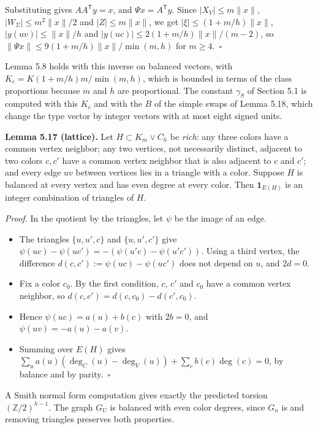 \documentclass[english,11pt,a4paper]{article}
\providecommand{\tightlist}{\setlength{\itemsep}{0pt}\setlength{\parskip}{0pt}}
\begin{document}
Substituting gives \(AA^{\mathsf T}y=x\), and \(\Psi x=A^{\mathsf T}y\). Since \(|X_V|\le m\|x\|\), \(|W_\Sigma|\le m^2\|x\|/2\) and \(|Z|\le m\|x\|\), we get \(|\xi|\le(1+m/h)\|x\|\), \(|y(uv)|\le\|x\|/h\) and \(|y(uc)|\le2(1+m/h)\|x\|/(m-2)\), so \(\|\Psi x\|\le9(1+m/h)\|x\|/\min(m,h)\) for \(m\ge4\).~\(\square\)

Lemma 5.8 holds with this inverse on balanced vectors, with \(K_c=K(1+m/h)m/\min(m,h)\), which is bounded in terms of the class proportions because \(m\) and \(h\) are proportional. The constant \(\gamma_S\) of Section 5.1 is computed with this \(K_c\) and with the \(B\) of the simple swaps of Lemma 5.18, which change the type vector by integer vectors with at most eight signed units.

\textbf{Lemma 5.17 (lattice).} Let \(H\subset K_m\vee C_h\) be \emph{rich}: any three colors have a common vertex neighbor; any two vertices, not necessarily distinct, adjacent to two colors \(c,c'\) have a common vertex neighbor that is also adjacent to \(c\) and \(c'\); and every edge \(uv\) between vertices lies in a triangle with a color. Suppose \(H\) is balanced at every vertex and has even degree at every color. Then \(\mathbf 1_{E(H)}\) is an integer combination of triangles of \(H\).

\emph{Proof.} In the quotient by the triangles, let \(\psi\) be the image of an edge.

\begin{itemize}
\tightlist
\item
  The triangles \(\{u,u',c\}\) and \(\{u,u',c'\}\) give \(\psi(uc)-\psi(uc')=-(\psi(u'c)-\psi(u'c'))\). Using a third vertex, the difference \(d(c,c'):=\psi(uc)-\psi(uc')\) does not depend on \(u\), and \(2d=0\).
\item
  Fix a color \(c_0\). By the first condition, \(c\), \(c'\) and \(c_0\) have a common vertex neighbor, so \(d(c,c')=d(c,c_0)-d(c',c_0)\).
\item
  Hence \(\psi(uc)=a(u)+b(c)\) with \(2b=0\), and \(\psi(uv)=-a(u)-a(v)\).
\item
  Summing over \(E(H)\) gives \(\sum_ua(u)(\deg_C(u)-\deg_V(u))+\sum_cb(c)\deg(c)=0\), by balance and by parity.~\(\square\)
\end{itemize}

A Smith normal form computation gives exactly the predicted torsion \((\mathbb Z/2)^{h-1}\). The graph \(G_U\) is balanced with even color degrees, since \(G_n\) is and removing triangles preserves both properties.
\end{document}
